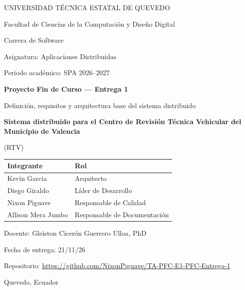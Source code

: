 \documentclass[11pt,a4paper]{article}
\newcommand{\proyecto}{Sistema distribuido para el Centro de Revisión Técnica Vehicular del Municipio de Valencia}
\newcommand{\proyectocorto}{RTV}
\newcommand{\repourl}{https://github.com/NixonPiguave/TA-PFC-E1-PFC-Entrega-1}
\begin{document}
	
	\begin{titlepage}
		\centering
		{\large UNIVERSIDAD TÉCNICA ESTATAL DE QUEVEDO\par}
		{\normalsize Facultad de Ciencias de la Computación y Diseño Digital\par}
		{\normalsize Carrera de Software\par}
		\vspace{1.5cm}
		{\normalsize Asignatura: Aplicaciones Distribuidas\par}
		  {\normalsize Periodo académico: SPA 2026--2027\par}
		\vspace{1.5cm}
		{\Large\bfseries Proyecto Fin de Curso — Entrega 1\par}
		\vspace{0.3cm}
		{\large Definición, requisitos y arquitectura base del sistema distribuido\par}
		\vspace{1cm}
		{\LARGE\bfseries \proyecto\par}
		\vspace{0.3cm}
		{\large (\proyectocorto)\par}
		\vspace{1.5cm}
		
		\begin{tabular}{ll}
			\toprule
			\textbf{Integrante} & \textbf{Rol} \\
			\midrule
			Kevin Garcia            & Arquitecto \\
			Diego Giraldo           & Líder de Desarrollo \\
			Nixon Piguave           & Responsable de Calidad \\
			Allison Mera Jumbo      & Responsable de Documentación \\
			\bottomrule
		\end{tabular}
		
		\vfill
		  {\normalsize Docente: Gleiston Cicerón Guerrero Ulloa, PhD\par}
		{\normalsize Fecha de entrega: 21/11/26\par}
		{\normalsize Repositorio: \url{\repourl}\par}
		\vspace{0.5cm}
		{\normalsize Quevedo, Ecuador\par}
	\end{titlepage}
	
\end{document}
